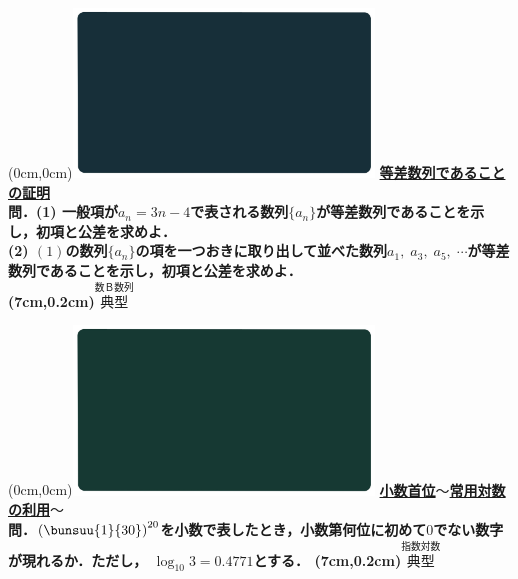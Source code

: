 \documentclass[10pt,
fleqn,
dvipdfmx,
uplatex
]{jsarticle}
\begin{document}
\at(0cm,0cm){\includegraphics[width=8cm,bb=0 0 1920 1080]{./youtube/thumbnails/templates/smart_background/数B数列.jpeg}}
{\color{orange}\bf\boldmath\Large\underline{等差数列であることの証明}}\vspace{0.3zw}\\
\normalsize 
\bf\boldmath 問．(1)  一般項が$a_n=3n-4$で表される数列$\{a_n\}$が等差数列であることを示し，初項と公差を求めよ．\\
(2)  $\left(1\right)$の数列$\{a_n\}$の項を一つおきに取り出して並べた数列$a_1,\;a_3,\;a_5,\;\cdots$が等差数列であることを示し，初項と公差を求めよ．\\

\at(7cm,0.2cm){\small\color{bradorange}$\overset{\text{数Ｂ数列}}{\text{典型}}$}

\newpage

\at(0cm,0cm){\includegraphics[width=8cm,bb=0 0 1920 1080]{./youtube/thumbnails/templates/smart_background/指数対数.jpeg}}
{\color{orange}\bf\boldmath\Large\underline{小数首位$〜$常用対数の利用$〜$}}\vspace{0zw}\\
\Large 
\bf\boldmath 問．$\left(\bunsuu{1}{{}30}\right)^{20}$を小数で表したとき，小数第何位に初めて$0$でない数字が現れるか．ただし，
$\log _{10}3=0.{4771}$とする．
\at(7cm,0.2cm){\small\color{bradorange}$\overset{\text{指数対数}}{\text{典型}}$}

\newpage
\end{document}
